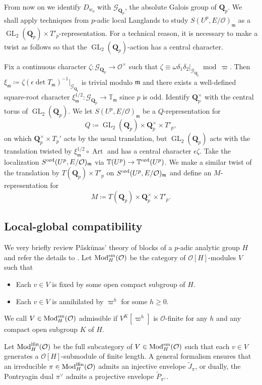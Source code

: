 \documentclass[leqno]{amsart}
\theoremstyle{definition}
\theoremstyle{remark}
\newcommand{\oo}{\mathcal{O}}
\newcommand{\Qp}{\mathbf{Q}_p}
\DeclareMathOperator{\GL}{GL}
\DeclareMathOperator{\Art}{Art}
\newcommand{\fm}{\mathfrak{m}}
\DeclareMathOperator{\Mod}{\textnormal{Mod}}
\newcommand{\Gp}{\mathcal{G}_{\Qp}} %
\newcommand{\sm}{\textnormal{sm}}
\newcommand{\lfin}{\textnormal{lfin}}
\newcommand{\TT}{\mathbb{T}} %
\newcommand{\ord}{\textnormal{ord}} %
\begin{document}
From now on we identify $D_{w_0}$ with $\Gp$, the absolute Galois
group of $\Qp$. We shall apply techniques from $p$-adic local Langlands
to study $S(U^p,E/\oo)_\fm$ as a $\GL_2(\Qp)\times T'_p$-representation.
For a technical reason, it is necessary to make a twist as follows
so that the $\GL_2(\Qp)$-action has a central character.

Fix a continuous character $\zeta\colon \Gp\to \oo^\times$
such that $\zeta\equiv \omega\delta_1\delta_2\vert_{\Gp}\bmod \varpi$.
Then $\xi_\fm\coloneqq\zeta(\epsilon \det T_\fm)^{-1}\vert_{\Gp}$ 
is trivial modulo $\fm$ and there exists a well-defined 
square-root character $\xi_\fm^{1/2} \colon\Gp\to \TT_\fm$
since $p$ is odd.
Identify $\Qp^\times$ with the central torus of $\GL_2(\Qp)$.
We let $S(U^p,E/\oo)_\fm$ be a $Q$-representation for
\[
    Q\coloneqq \GL_2(\Qp)\times \Qp^\times \times T'_p,
\]
on which $\Qp^\times\times T_p'$ acts by the usual translation,
but $\GL_2(\Qp)$ acts with the translation
twisted by $\xi_\fm^{1/2}\circ\Art$ 
and has a central character $\epsilon\zeta$.
Take the localization $S^{\ord}(U^p,E/\oo)_\fm$ via 
$\TT(U^p)\to \TT^{\ord}(U^p)$.
We make a similar twist of the translation by $T(\Qp)\times T'_p$
on $S^{\ord}(U^p,E/\oo)_\fm$ and define an $M$-representation for 
\[
    M\coloneqq T(\Qp)\times \Qp^\times \times T'_p.
\]


\subsection{Local-global compatibility}

We very briefly review P\v ask\={u}nas' theory of blocks 
of a $p$-adic analytic group $H$ and refer the details to \cite{pask}.
Let $\Mod^{\sm}_H(\oo)$ be the category 
of $\oo[H]$-modules $V$ such that 
\begin{itemize}
    \item Each $v\in V$ is fixed by some open compact subgroup of $H$.
    \item Each $v\in V$ is annihilated by $\varpi^h$ for some $h\geq 0$.
\end{itemize}
We call $V\in \Mod^{\sm}_{H}(\oo)$ admissible if
$V^K[\varpi^h]$ is $\oo$-finite 
for any $h$ and any compact open subgroup $K$ of $H$.

Let $\Mod^{\lfin}_H(\oo)$ be the full subcategory of
$V\in \Mod^{\sm}_{H}(\oo)$  such that each $v\in V$ generates 
a $\oo[H]$-submodule of finite length.
A general formalism ensures that 
an irreducible $\pi\in \Mod^{\lfin}_H(\oo)$ admits
an injective envelope $\tilde{J}_\pi$, or dually, 
the Pontryagin dual $\pi^\vee$ 
admits a projective envelope $\tilde{P}_{\pi^\vee}$.
\end{document}
